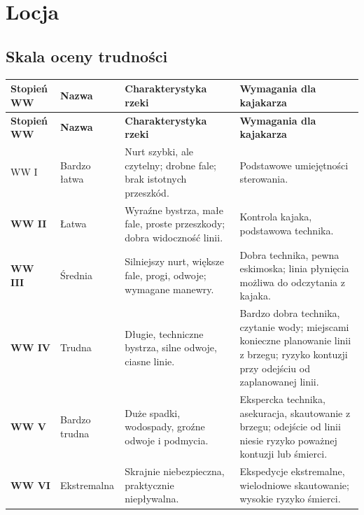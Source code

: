 \section{Locja}

\subsection{Skala oceny trudności}

\begin{longtable}{>{\bfseries\centering}p{1.8cm}
                  >{\centering}p{2.2cm}
                  p{5.2cm}
                  p{4.2cm}}
  \toprule
  \textbf{Stopień WW} & \textbf{Nazwa} & \textbf{Charakterystyka rzeki}
    & \textbf{Wymagania dla kajakarza} \\
  \midrule
  \endfirsthead
  \toprule
  \textbf{Stopień WW} & \textbf{Nazwa} & \textbf{Charakterystyka rzeki}
    & \textbf{Wymagania dla kajakarza} \\
  \midrule
  \endhead
  \bottomrule
  \endfoot

  WW I & Bardzo łatwa
    & Nurt szybki, ale czytelny; drobne fale; brak istotnych przeszkód. & Podstawowe umiejętności sterowania. \\[4pt]

  WW II & Łatwa & Wyraźne bystrza, małe fale, proste przeszkody; dobra widoczność linii. & Kontrola kajaka, podstawowa technika. \\[4pt]

  WW III & Średnia & Silniejszy nurt, większe fale, progi, odwoje; wymagane manewry. & Dobra technika, pewna eskimoska; linia płynięcia możliwa do odczytania
      z kajaka. \\[4pt]

  WW IV & Trudna & Długie, techniczne bystrza, silne odwoje, ciasne linie. & Bardzo dobra technika, czytanie wody; miejscami konieczne planowanie linii z brzegu; ryzyko kontuzji przy odejściu od zaplanowanej linii. \\[4pt]

  WW V & Bardzo trudna & Duże spadki, wodospady, groźne odwoje i podmycia. & Ekspercka technika, asekuracja, skautowanie z brzegu; odejście od linii niesie ryzyko poważnej kontuzji lub śmierci. \\[4pt]

  WW VI & Ekstremalna & Skrajnie niebezpieczna, praktycznie niepływalna. & Ekspedycje ekstremalne, wielodniowe skautowanie; wysokie ryzyko śmierci. \\
\end{longtable}

